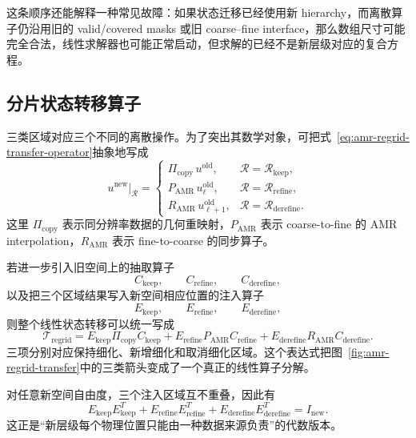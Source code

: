 这条顺序还能解释一种常见故障：如果状态迁移已经使用新 hierarchy，而离散算子仍沿用旧的 valid/covered masks 或旧 coarse--fine interface，那么数组尺寸可能完全合法，线性求解器也可能正常启动，但求解的已经不是新层级对应的复合方程。

\subsection{分片状态转移算子}

三类区域对应三个不同的离散操作。为了突出其数学对象，可把式~\eqref{eq:amr-regrid-transfer-operator}抽象地写成
\begin{equation}
\left.u^{\mathrm{new}}\right|_{\mathcal R}
=
\begin{cases}
\Pi_{\mathrm{copy}}\,u^{\mathrm{old}},
& \mathcal R=\mathcal R_{\mathrm{keep}},\\[1mm]
P_{\mathrm{AMR}}\,u^{\mathrm{old}}_{\ell},
& \mathcal R=\mathcal R_{\mathrm{refine}},\\[1mm]
R_{\mathrm{AMR}}\,u^{\mathrm{old}}_{\ell+1},
& \mathcal R=\mathcal R_{\mathrm{derefine}}.
\end{cases}
\label{eq:amr-regrid-piecewise-transfer}
\end{equation}
这里 $\Pi_{\mathrm{copy}}$ 表示同分辨率数据的几何重映射，$P_{\mathrm{AMR}}$ 表示 coarse-to-fine 的 AMR interpolation，$R_{\mathrm{AMR}}$ 表示 fine-to-coarse 的同步算子。

若进一步引入旧空间上的抽取算子
\begin{equation}
C_{\mathrm{keep}},
\qquad
C_{\mathrm{refine}},
\qquad
C_{\mathrm{derefine}},
\end{equation}
以及把三个区域结果写入新空间相应位置的注入算子
\begin{equation}
E_{\mathrm{keep}},
\qquad
E_{\mathrm{refine}},
\qquad
E_{\mathrm{derefine}},
\end{equation}
则整个线性状态转移可以统一写成
\begin{equation}
\boxed{
\mathcal T_{\mathrm{regrid}}
=
E_{\mathrm{keep}}\Pi_{\mathrm{copy}}C_{\mathrm{keep}}
+
E_{\mathrm{refine}}P_{\mathrm{AMR}}C_{\mathrm{refine}}
+
E_{\mathrm{derefine}}R_{\mathrm{AMR}}C_{\mathrm{derefine}}.
}
\label{eq:amr-regrid-operator-decomposition}
\end{equation}
三项分别对应保持细化、新增细化和取消细化区域。这个表达式把图~\ref{fig:amr-regrid-transfer}中的三类箭头变成了一个真正的线性算子分解。

对任意新空间自由度，三个注入区域互不重叠，因此有
\begin{equation}
E_{\mathrm{keep}}E_{\mathrm{keep}}^T
+
E_{\mathrm{refine}}E_{\mathrm{refine}}^T
+
E_{\mathrm{derefine}}E_{\mathrm{derefine}}^T
=
I_{\mathrm{new}}.
\label{eq:amr-regrid-partition-identity}
\end{equation}
这正是“新层级每个物理位置只能由一种数据来源负责”的代数版本。

